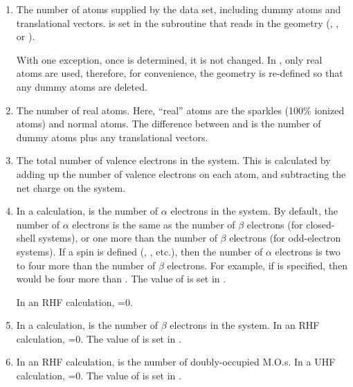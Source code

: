 \begin{enumerate}
\item {} The number of atoms supplied by the data set,
including dummy atoms and translational vectors.   is set in the
subroutine that
reads in the geometry (, , or ).

With one exception, once  is determined, it is not changed.
In , only real atoms are used, therefore, for convenience,
the geometry is re-defined so that any dummy atoms are deleted.
\item {} The number of real atoms.  Here, ``real'' atoms are
the sparkles (100\% ionized atoms) and normal atoms.  The difference
between  and  is the number of dummy atoms plus
any translational vectors.
\item{} The total number of valence electrons in the system.  This
is calculated by adding up the number of valence electrons on each atom, and
subtracting the net charge on the system.
\item{} In a  calculation,  is the number
of $\alpha$ electrons in the system.  By default, the number of $\alpha$
electrons is the same as the number of $\beta$ electrons (for closed-shell
systems), or one more than the number of $\beta$ electrons (for odd-electron
systems). If a spin is defined (, , etc.), then the
number of $\alpha$ electrons is two to four more than the number of $\beta$
electrons. For example, if  is specified, then 
would be four more than . The value of  is set in
.

In an RHF calculation, =0.
\item{} In a  calculation,  is the number
of $\beta$ electrons in the system. In an RHF calculation, =0.
The value of  is set in
.


\item{} In an RHF calculation,  is the number of
doubly-occupied M.O.s. In a UHF calculation, =0.
The value of  is set in  .


\end{enumerate}
